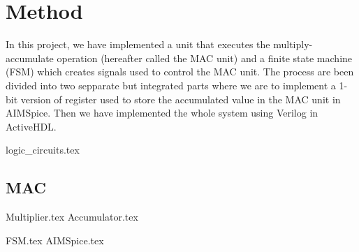 \section{Method}
In this project, we have implemented a unit that executes the multiply-accumulate
operation (hereafter called the MAC unit) and a finite state machine (FSM) which creates
signals used to control the MAC unit. The process are been divided into two sepparate but integrated parts where we are to implement a 1-bit version of register used to store the accumulated value in the MAC unit in AIMSpice. Then we have implemented the whole system using Verilog in ActiveHDL.



{logic_circuits.tex}
\subsection{MAC} 
{Multiplier.tex}
{Accumulator.tex}


{FSM.tex}
{AIMSpice.tex}

